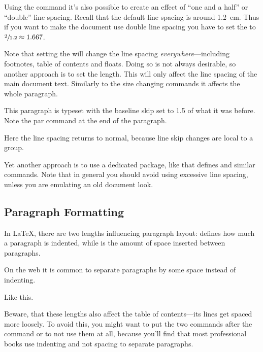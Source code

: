 Using the  command it's also possible to create an effect of
\enquote{one and a half} or \enquote{double} line spacing. Recall that the
default line spacing is around \qty{1.2}{em}. Thus if you want to make the
document use double line spacing you have to set the  to
\(\sfrac{2}{1.2} \approx 1.667\).

Note that setting the  will change the line spacing
\emph{everywhere}---including footnotes, table of contents and floats. Doing so
is not always desirable, so another approach is to set the 
length. This will only affect the line spacing of the main document text.
Similarly to the size changing commands it affects the whole paragraph.
\begin{example}
{\setlength{\baselineskip}{%
  1.5\baselineskip}
This paragraph is typeset with
the baseline skip set to 1.5 of
what it was before. Note the
par command at the end of the
paragraph.\par}

Here the line spacing returns
to normal, because line skip
changes are local to a group.
\end{example}

Yet another approach is to use a dedicated package, like  that
defines  and similar commands. Note that in general you
should avoid using excessive line spacing, unless you are emulating an old
document look.

\subsection{Paragraph Formatting}\label{parsp}

In \LaTeX{}, there are two lengths influencing paragraph layout:
 defines how much a paragraph is indented, while 
is the amount of space inserted between paragraphs.
\begin{example}
\setlength{\parindent}{0pt}
\setlength{\parskip}{%
  \medskipamount}

On the web it is common to
separate paragraphs by some
space instead of indenting.

Like this.
\end{example}
Beware, that these lengths also affect the table of contents---its lines get
spaced more loosely. To avoid this, you might want to put the two commands
after the  command or to not use them at all, because
you'll find that most professional books use indenting and not spacing to
separate paragraphs.

